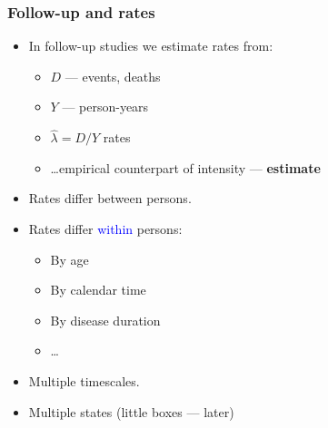 

\begin{frame}[fragile]
  \frametitle{Follow-up and rates}
  \begin{itemize}[<+->]
  \item In follow-up studies we estimate rates from:

    \begin{itemize}[<+->]
    \item $D$ --- events, deaths
    \item $Y$ --- person-years
    \item $\hat\lambda = D/Y$ rates
    \item \ldots empirical counterpart of intensity --- \textbf{estimate}
    \end{itemize}

  \item Rates differ between persons.
  \item Rates differ \textcolor{blue}{within} persons:

    \begin{itemize}[<+->]
    \item By age
    \item By calendar time
    \item By disease duration
    \item \ldots
    \end{itemize}

  \item Multiple timescales.
  \item Multiple states (little boxes --- later)
  \end{itemize}

\end{frame}


